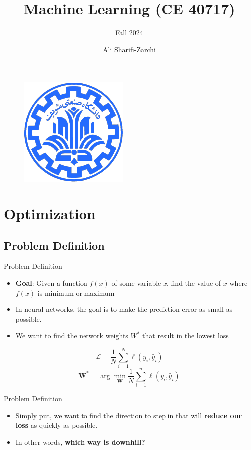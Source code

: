 \documentclass[serif, aspectratio=169]{beamer}
\author{Ali Sharifi-Zarchi}
\title{Machine Learning (CE 40717)}
\subtitle{Fall 2024}
\institute{
    CE Department \\
    Sharif University of Technology
}
\begin{document}
\begin{frame}
    \titlepage
    \vspace*{-0.6cm}
    \begin{figure}[htpb]
        \begin{center}
            \includegraphics[keepaspectratio, scale=0.25]{pic/sharif-main-logo.png}
        \end{center}
    \end{figure}
\end{frame}

\begin{frame}    
\tableofcontents[sectionstyle=show,
subsectionstyle=show/shaded/hide,
subsubsectionstyle=show/shaded/hide]
\end{frame}

\section{Optimization}
\subsection{Problem Definition}

\begin{frame}{Problem Definition}
    \begin{itemize}%
        \item \textbf{Goal}: Given a function $f(x)$ of some variable $x$, find the value of $x$ where $f(x)$ is minimum or maximum
        \item In neural networks, the goal is to make the prediction error as small as possible.
        \item We want to find the network weights $W^*$ that result in the lowest loss
    \end{itemize}
    
    \[
    \mathcal{L} = \frac{1}{N} \sum_{i=1}^{N} \ell(y_i, \hat{y}_i)
    \]
    \[
    \mathbf{W}^* = \arg\min_{\mathbf{W}} \frac{1}{N} \sum_{i=1}^{n} \ell(y_i, \hat{y}_i)
    \]
\end{frame}
\begin{frame}{Problem Definition}
    \begin{itemize}
        \item Simply put, we want to find the direction to step in that will \textbf{reduce our loss} as quickly as possible.
        \item In other words, \textbf{which way is downhill?}
    \end{itemize}
\end{frame}
\end{document}
